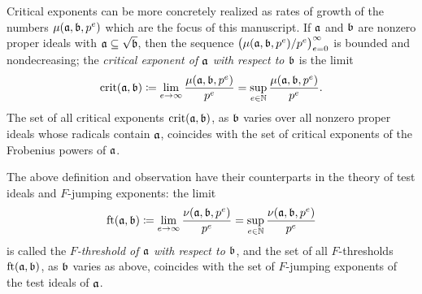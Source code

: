 \documentclass{amsart}
\begin{document}
Critical exponents can be more concretely realized as rates of growth of the numbers $\mu(\mathfrak{a},\mathfrak{b},p^e)$ which are the focus of this manuscript.
If $\mathfrak{a}$ and $\mathfrak{b}$ are nonzero proper ideals with $\mathfrak{a} \subseteq \sqrt {\mathfrak{b}}$, then the sequence $\big(\mu(\mathfrak{a},\mathfrak{b},p^e)/p^e\big)_{e=0}^\infty$ is bounded and nondecreasing; the \emph{critical exponent of $\mathfrak{a}$ with respect to $\mathfrak{b}$} is the limit
\[
   \operatorname{crit}(\mathfrak{a},\mathfrak{b}) \coloneqq \lim_{e\to \infty} \frac{\mu(\mathfrak{a},\mathfrak{b},p^e)}{p^e}
   = \sup_{e\in \mathbb{N}} \frac{\mu(\mathfrak{a},\mathfrak{b},p^e)}{p^e}.
\]
The set of all critical exponents $\operatorname{crit}(\mathfrak{a},\mathfrak{b})$, as $\mathfrak{b}$ varies over all nonzero proper ideals whose radicals contain $\mathfrak{a}$, coincides with the set of critical exponents of the Frobenius powers of $\mathfrak{a}$.

The above definition and observation have their counterparts in the theory of test ideals and $F$-jumping exponents: the limit
\[
   \operatorname{ft}(\mathfrak{a}, \mathfrak{b}) \coloneqq \lim_{e\to \infty} \frac{\nu(\mathfrak{a},\mathfrak{b},p^e)}{p^e}
   = \sup_{e\in \mathbb{N}} \frac{\nu(\mathfrak{a},\mathfrak{b},p^e)}{p^e}
\]
is called the \emph{$F$-threshold of $\mathfrak{a}$ with respect to $\mathfrak{b}$}, and the set of all $F$-thresholds $\operatorname{ft}(\mathfrak{a}, \mathfrak{b})$, as $\mathfrak{b}$ varies as above, coincides with the set of $F$-jumping exponents of the test ideals of $\mathfrak{a}$.



\end{document}
